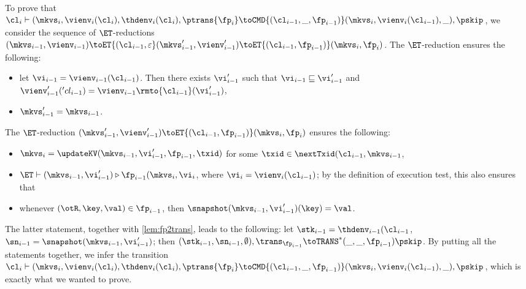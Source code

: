 \begin{itemize}
To prove that $\cl_{i} \vdash (\mkvs_i, \vienv_{i}(\cl_{i}), \thdenv_{i}(\cl_{i}), \ptrans{\fp_{i}} 
\toCMD{(\cl_{i-1}, \_, \fp_{i-1})} (\mkvs_{i}, \vienv_{i}(\cl_{i-1}), \_), \pskip$, 
we consider the sequence of $\ET$-reductions $(\mkvs_{i-1}, \vienv_{i-1}) \toET{(\cl_{i-1}, \varepsilon} (\mkvs_{i-1}', \vienv_{i-1}') 
\toET{(\cl_{i-1}, \fp_{i-1})} (\mkvs_{i}, \fp_{i})$. The $\ET$-reduction ensures the following: 
\begin{itemize}
\item let $\vi_{i-1} = \vienv_{i-1}(\cl_{i-1})$. Then there exists $\vi_{i-1}'$ such that $\vi_{i-1} \sqsubseteq \vi_{i-1}'$ and
$\vienv_{i-1}'('cl_{i-1}) = \vienv_{i-1}\rmto{\cl_{i-1}}(\vi_{i-1}')$, 
\item $\mkvs_{i-1}' = \mkvs_{i-1}$.
\end{itemize}
The $\ET$-reduction $(\mkvs_{i-1}', \vienv_{i-1}') 
\toET{(\cl_{i-1}, \fp_{i-1})} (\mkvs_{i}, \fp_{i})$ ensures the following: 
\begin{itemize}
\item $\mkvs_i = \updateKV(\mkvs_{i-1}, \vi_{i-1}', \fp_{i-1}, \txid)$ for some $\txid \in \nextTxid(\cl_{i-1}, \mkvs_{i-1}$, 
\item $\ET \vdash (\mkvs_{i-1}, \vi_{i-1}') \triangleright \fp_{i-1} (\mkvs_{i}, \vi_{i}$, where $\vi_{i} = \vienv_{i}(\cl_{i-1})$; 
by the definition of execution test, this also ensures that 
\item whenever $(\otR, \key, \val) \in \fp_{i-1}$, then $\snapshot(\mkvs_{i-1}, \vi_{i-1}')(\key) = \val$.
\end{itemize}
The latter statement, together with \cref{lem:fp2trans}, leads to the following: let $\stk_{i-1} = \thdenv_{i-1}(\cl_{i-1}$, 
$\sn_{i-1} = \snapshot(\mkvs_{i-1}, \vi_{i-1}')$; then 
$(\stk_{i-1}, \sn_{i-1}, \emptyset), \trans_{\fp_{i-1}} \toTRANS^{\ast} (\_, \_, \fp_{i-1}) \pskip$. 
By putting all the statements together, we infer the transition 
$\cl_{i} \vdash (\mkvs_i, \vienv_{i}(\cl_{i}), \thdenv_{i}(\cl_{i}), \ptrans{\fp_{i}} 
\toCMD{(\cl_{i-1}, \_, \fp_{i-1})} (\mkvs_{i}, \vienv_{i}(\cl_{i-1}), \_), \pskip$, which is exactly 
what we wanted to prove.
\end{itemize}
%
%
%
